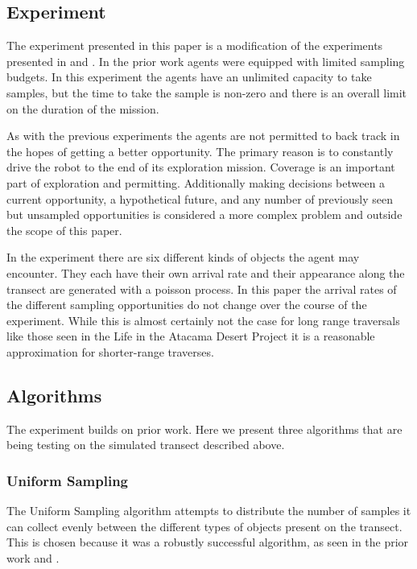 \subsection{Experiment}

The experiment presented in this paper is a modification of the experiments
presented in \cite{furlong2014sequential} and \cite{furlong2014budgeting}.  In the
prior work agents were equipped with limited sampling budgets.  In this
experiment the agents have an unlimited capacity to take samples, but the time
to take the sample is non-zero and there is an overall limit on the duration of
the mission.

As with the previous experiments the agents are not permitted to back track in
the hopes of getting a better opportunity.  The primary reason is to constantly
drive the robot to the end of its exploration mission.  Coverage is an
important part of exploration and permitting.  Additionally making decisions
between a current opportunity, a hypothetical future, and any number of
previously seen but unsampled opportunities is considered a more complex
problem and outside the scope of this paper.

In the experiment there are six different kinds of objects the agent may
encounter.  They each have their own arrival rate and their appearance along
the transect are generated with a poisson process.  In this paper the arrival
rates of the different sampling opportunities do not change over the course of
the experiment.  While this is almost certainly not the case for long range
traversals like those seen in the Life in the Atacama Desert Project it is a
reasonable approximation for shorter-range traverses.

\subsection{Algorithms}


	The experiment builds on prior work.  Here we present three algorithms that are being testing on the simulated transect described above.

\subsubsection{Uniform Sampling}

The Uniform Sampling algorithm attempts to distribute the number of samples it
can collect evenly between the different types of objects present on the
transect.  This is chosen because it was a robustly successful algorithm, as
seen in the prior work \cite{furlong2014sequential} and \cite{furlong2014isairas}.


